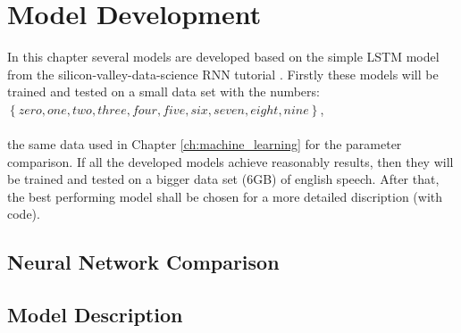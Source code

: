 \chapter{Model Development}\label{ch:model_development}

In this chapter several models are developed based on the simple LSTM model from the silicon-valley-data-science RNN tutorial \cite{rubashkin2017}. Firstly these models will be trained and tested on a small data set with the numbers:\\ 

$\left\{zero, one, two, three, four, five, six, seven, eight, nine \right\}$,\\\\
the same data used in Chapter \ref{ch:machine_learning} for the parameter comparison. If all the developed models achieve reasonably results, then they will be trained and tested on a bigger data set (6GB) of english speech. After that, the best performing model shall be chosen for a more detailed discription (with code).

\section{Neural Network Comparison}



\section{Model Description}